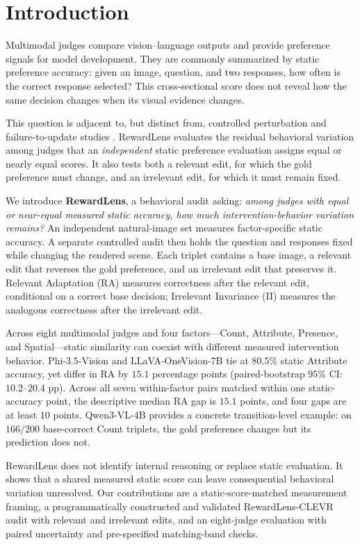 \section{Introduction}
\label{sec:introduction}

Multimodal judges compare vision--language outputs and provide preference
signals for model development. They are commonly summarized by static
preference accuracy: given an image, question, and two responses, how often is
the correct response selected? This cross-sectional score does not reveal how
the same decision changes when its visual evidence changes.

This question is adjacent to, but distinct from, controlled perturbation and
failure-to-update studies \citep{lee2026mmjudgebias,park2026mitigating,zhu2026visualflip}.
RewardLens evaluates the residual behavioral variation among judges that an
\emph{independent} static preference evaluation assigns equal or nearly equal
scores. It also tests both a relevant edit, for which the gold preference must
change, and an irrelevant edit, for which it must remain fixed.

We introduce \textbf{RewardLens}, a behavioral audit asking:
\emph{among judges with equal or near-equal measured static accuracy, how much
intervention-behavior variation remains?} An independent natural-image set
measures factor-specific static accuracy. A separate controlled audit then
holds the question and responses fixed while changing the rendered scene. Each
triplet contains a base image, a relevant edit that reverses the gold
preference, and an irrelevant edit that preserves it. Relevant Adaptation (RA)
measures correctness after the relevant edit, conditional on a correct base
decision; Irrelevant Invariance (II) measures the analogous correctness after
the irrelevant edit.

Across eight multimodal judges and four factors---Count, Attribute, Presence,
and Spatial---static similarity can coexist with different measured
intervention behavior. Phi-3.5-Vision and LLaVA-OneVision-7B tie at $80.5\%$
static Attribute accuracy, yet differ in RA by $15.1$ percentage points
(paired-bootstrap 95\% CI: $10.2$--$20.4$ pp). Across all seven within-factor
pairs matched within one static-accuracy point, the descriptive median RA gap
is $15.1$ points, and four gaps are at least $10$ points. Qwen3-VL-4B provides
a concrete transition-level example: on $166/200$ base-correct Count triplets,
the gold preference changes but its prediction does not.

RewardLens does not identify internal reasoning or replace static evaluation.
It shows that a shared measured static score can leave consequential behavioral
variation unresolved. Our contributions are a static-score-matched measurement
framing, a programmatically constructed and validated RewardLens-CLEVR audit
with relevant and irrelevant edits, and an eight-judge evaluation with paired
uncertainty and pre-specified matching-band checks.
